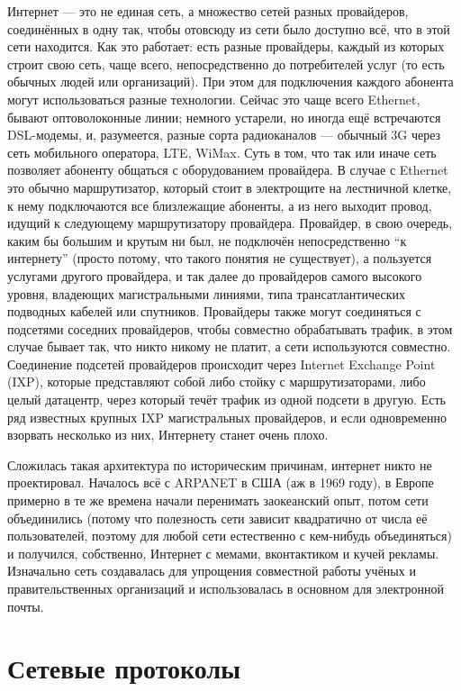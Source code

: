 \documentclass[a5paper]{article}
\begin{document}
Интернет --- это не единая сеть, а множество сетей разных провайдеров, соединённых в одну так, чтобы отовсюду из сети было доступно всё, что в этой сети находится. Как это работает: есть разные провайдеры, каждый из которых строит свою сеть, чаще всего, непосредственно до потребителей услуг (то есть обычных людей или организаций). При этом для подключения каждого абонента могут использоваться разные технологии. Сейчас это чаще всего Ethernet, бывают оптоволоконные линии; немного устарели, но иногда ещё встречаются DSL-модемы, и, разумеется, разные сорта радиоканалов --- обычный 3G через сеть мобильного оператора, LTE, WiMax. Суть в том, что так или иначе сеть позволяет абоненту общаться с оборудованием провайдера. В случае с Ethernet это обычно маршрутизатор, который стоит в электрощите на лестничной клетке, к нему подключаются все близлежащие абоненты, а из него выходит провод, идущий к следующему маршрутизатору провайдера. Провайдер, в свою очередь, каким бы большим и крутым ни был, не подключён непосредственно ``к интернету'' (просто потому, что такого понятия не существует), а пользуется услугами другого провайдера, и так далее до провайдеров самого высокого уровня, владеющих магистральными линиями, типа трансатлантических подводных кабелей или спутников. Провайдеры также могут соединяться с подсетями соседних провайдеров, чтобы совместно обрабатывать трафик, в этом случае бывает так, что никто никому не платит, а сети используются совместно. Соединение подсетей провайдеров происходит через Internet Exchange Point (IXP), которые представляют собой либо стойку с маршрутизаторами, либо целый датацентр, через который течёт трафик из одной подсети в другую. Есть ряд известных крупных IXP магистральных провайдеров, и если одновременно взорвать несколько из них, Интернету станет очень плохо.

Сложилась такая архитектура по историческим причинам, интернет никто не проектировал. Началось всё с ARPANET в США (аж в 1969 году), в Европе примерно в те же времена начали перенимать заокеанский опыт, потом сети объединились (потому что полезность сети зависит квадратично от числа её пользователей, поэтому для любой сети естественно с кем-нибудь объединяться) и получился, собственно, Интернет с мемами, вконтактиком и кучей рекламы. Изначально сеть создавалась для упрощения совместной работы учёных и правительственных организаций и использовалась в основном для электронной почты.

\section{Сетевые протоколы}
\end{document}
